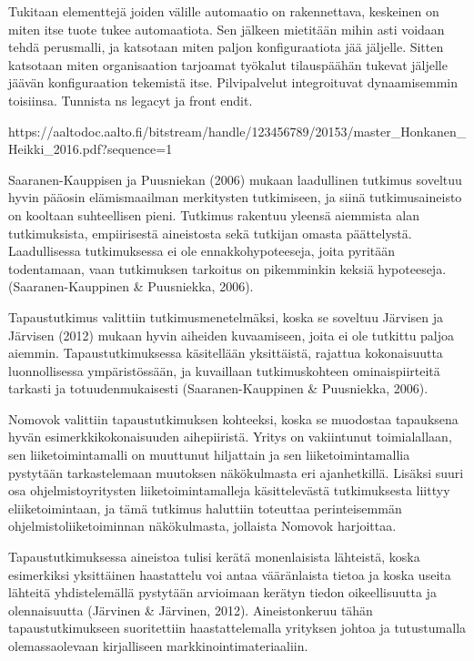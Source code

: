 \documentclass[finnish,12pt,a4paper,pdftex]{article}
\begin{document}
Tukitaan elementtejä joiden välille automaatio on rakennettava, keskeinen on miten itse tuote tukee automaatiota. Sen jälkeen mietitään mihin asti voidaan tehdä perusmalli, ja katsotaan miten paljon konfiguraatiota jää jäljelle. Sitten katsotaan miten organisaation tarjoamat työkalut tilauspäähän tukevat jäljelle jäävän konfiguraation tekemistä itse. Pilvipalvelut integroituvat dynaamisemmin toisiinsa. Tunnista ns legacyt ja front endit.


https://aaltodoc.aalto.fi/bitstream/handle/123456789/20153/master_Honkanen_Heikki_2016.pdf?sequence=1 

Saaranen-Kauppisen ja Puusniekan (2006) mukaan laadullinen tutkimus soveltuu hyvin pääosin elämismaailman merkitysten tutkimiseen, ja siinä tutkimusaineisto on kooltaan suhteellisen pieni. Tutkimus rakentuu yleensä aiemmista alan tutkimuksista, empiirisestä aineistosta sekä tutkijan omasta päättelystä. Laadullisessa tutkimuksessa ei ole ennakkohypoteeseja, joita pyritään todentamaan, vaan tutkimuksen tarkoitus on pikemminkin keksiä hypoteeseja. (Saaranen-Kauppinen & Puusniekka, 2006). 

Tapaustutkimus valittiin tutkimusmenetelmäksi, koska se soveltuu Järvisen ja Järvisen (2012) mukaan hyvin aiheiden kuvaamiseen, joita ei ole tutkittu paljoa aiemmin. Tapaustutkimuksessa käsitellään yksittäistä, rajattua kokonaisuutta luonnollisessa ympäristössään, ja kuvaillaan tutkimuskohteen ominaispiirteitä tarkasti ja totuudenmukaisesti (Saaranen-Kauppinen & Puusniekka, 2006). 

Nomovok valittiin tapaustutkimuksen kohteeksi, koska se muodostaa tapauksena hyvän esimerkkikokonaisuuden aihepiiristä. Yritys on vakiintunut toimialallaan, sen
liiketoimintamalli on muuttunut hiljattain ja sen liiketoimintamallia pystytään tarkastelemaan muutoksen näkökulmasta eri ajanhetkillä. Lisäksi suuri osa ohjelmistoyritysten liiketoimintamalleja käsittelevästä tutkimuksesta liittyy eliiketoimintaan, ja tämä tutkimus haluttiin toteuttaa perinteisemmän ohjelmistoliiketoiminnan näkökulmasta, jollaista Nomovok harjoittaa.

Tapaustutkimuksessa aineistoa tulisi kerätä monenlaisista lähteistä, koska esimerkiksi yksittäinen haastattelu voi antaa vääränlaista tietoa ja koska useita lähteitä yhdistelemällä pystytään arvioimaan kerätyn tiedon oikeellisuutta ja olennaisuutta (Järvinen & Järvinen, 2012). Aineistonkeruu tähän tapaustutkimukseen suoritettiin haastattelemalla yrityksen johtoa ja tutustumalla olemassaolevaan kirjalliseen markkinointimateriaaliin.
\end{document}

